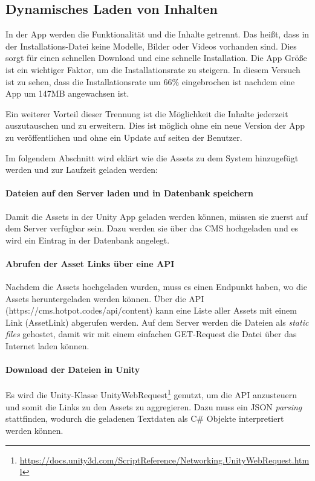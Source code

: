 \documentclass[titlepage, a4paper, 11pt]{scrartcl}
\begin{document}
  \subsection{Dynamisches Laden von Inhalten}

  In der App werden die Funktionalität und die Inhalte getrennt. Das heißt, dass in der Installations-Datei keine Modelle, Bilder oder Videos vorhanden sind.
  Dies sorgt für einen schnellen Download und eine schnelle Installation.
  Die App Größe ist ein wichtiger Faktor, um die Installationsrate zu steigern.
  In diesem Versuch \cite{Effectof10:online} ist zu sehen, dass die Installationsrate
  um 66\% eingebrochen ist nachdem eine App um 147MB angewachsen ist.

  Ein weiterer Vorteil dieser Trennung ist die Möglichkeit die Inhalte jederzeit auszutauschen und zu erweitern.
  Dies ist möglich ohne ein neue Version der App zu veröffentlichen und ohne ein Update auf seiten der Benutzer.

  Im folgendem Abschnitt wird eklärt wie die Assets zu dem System hinzugefügt werden und zur Laufzeit geladen werden:

  \paragraph{Dateien auf den Server laden und in Datenbank speichern}
  Damit die Assets in der Unity App geladen werden können, müssen sie zuerst auf dem Server verfügbar sein.
  Dazu werden sie über das CMS hochgeladen und es wird ein Eintrag in der Datenbank angelegt.

  \paragraph{Abrufen der Asset Links über eine API}
  Nachdem die Assets hochgeladen wurden, muss es einen Endpunkt haben, wo die Assets heruntergeladen werden können.
  Über die API (https://cms.hotpot.codes/api/content) kann eine Liste aller Assets mit einem Link (AssetLink) abgerufen werden.
  Auf dem Server werden die Dateien als \textit{static files} gehostet, damit wir mit einem einfachen GET-Request die Datei über das Internet laden können.

  \paragraph{Download der Dateien in Unity}
  Es wird die Unity-Klasse UnityWebRequest\footnote{\url{https://docs.unity3d.com/ScriptReference/Networking.UnityWebRequest.html}} genutzt, um die API anzusteuern und somit die Links zu den Assets zu aggregieren.
  Dazu muss ein JSON \textit{parsing} stattfinden, wodurch die geladenen Textdaten als C\# Objekte interpretiert werden können.
\end{document}
